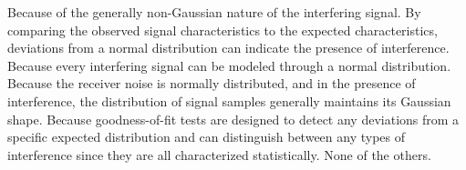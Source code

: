 \begin{checkboxes}
    \CorrectChoice Because of the generally non-Gaussian nature of the interfering signal. By comparing the observed signal characteristics to the expected characteristics, deviations from a normal distribution can indicate the presence of interference.
    \choice Because every interfering signal can be modeled through a normal distribution.
    \choice Because the receiver noise is normally distributed, and in the presence of interference, the distribution of signal samples generally maintains its Gaussian shape.
    \choice Because goodness-of-fit tests are designed to detect any deviations from a specific expected distribution and can distinguish between any types of interference since they are all characterized statistically.
    \choice None of the others.
\end{checkboxes}